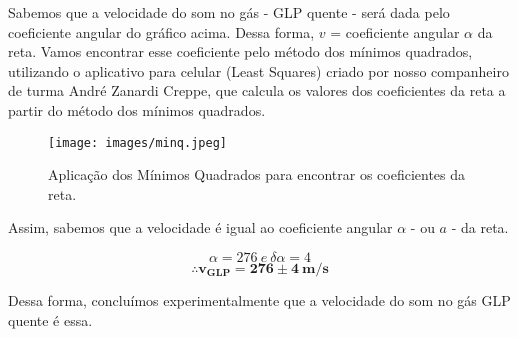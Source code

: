 Sabemos que a velocidade do som no gás - GLP quente - será dada pelo coeficiente angular do gráfico acima. Dessa forma, $v$ = coeficiente angular $\alpha$ da reta. Vamos encontrar esse coeficiente pelo método dos mínimos quadrados, utilizando o aplicativo para celular (Least Squares) criado por nosso companheiro de turma André Zanardi Creppe, que calcula os valores dos coeficientes da reta a partir do método dos mínimos quadrados.

\begin{figure}[H]
  \centering
  \texttt{[image: images/minq.jpeg]}
  \caption{Aplicação dos Mínimos Quadrados para encontrar os coeficientes da reta.}
\end{figure}

Assim, sabemos que a velocidade é igual ao coeficiente angular $\alpha$ - ou $a$ - da reta. 

\[ \alpha = 276 \ e \ \delta \alpha = 4 \]
\[ \mathbf{\therefore v_{GLP} = 276 \pm 4 \ m/s} \]

Dessa forma, concluímos experimentalmente que a velocidade do som no gás GLP quente é essa.
